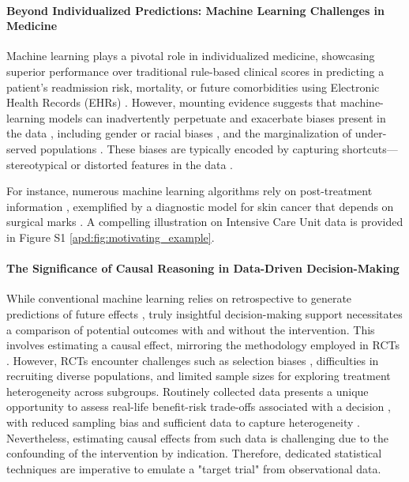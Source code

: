 \documentclass[10pt,letterpaper]{article}
\begin{document}
 \paragraph{Beyond Individualized Predictions: Machine Learning Challenges in Medicine} \cite{rajkomar2018scalable,liu2019comparison,li2020behrt,beaulieu2021machine,aggarwal2021diagnostic}
 Machine learning plays a pivotal role in individualized medicine, showcasing superior performance over traditional rule-based clinical scores in predicting a patient's readmission risk, mortality, or future comorbidities using Electronic Health Records (EHRs) \cite{rajkomar2018scalable,liu2019comparison,li2020behrt,beaulieu2021machine,aggarwal2021diagnostic}.
However, mounting evidence suggests that machine-learning models can inadvertently perpetuate and exacerbate biases present in the data \cite{rajkomar2018ensuring}, including gender or racial biases \cite{singh2022generalizability,gichoya2022ai}, and the marginalization of under-served populations \cite{seyyed2021underdiagnosis}. These biases are typically encoded by capturing shortcuts—stereotypical or distorted features in the data \cite{geirhos2020shortcut,winkler2019association,degrave2021ai}.

For instance, numerous machine learning algorithms rely on post-treatment information \cite{badgeley2019deep,obermeyer2019dissecting,yuan2021temporal,wong2021external}, exemplified by a diagnostic model for skin cancer that depends on surgical marks \cite{winkler2019association}. A compelling illustration on Intensive Care Unit data is provided in Figure S1 \ref{apd:fig:motivating_example}.

  \paragraph{The Significance of Causal Reasoning in Data-Driven Decision-Making} \cite{prosperi2020causal}
 While conventional machine learning relies on retrospective to generate predictions of future effects \cite{plecko2022causal}, truly insightful decision-making support necessitates a comparison of potential outcomes with and without the intervention. This involves estimating a causal effect, mirroring the methodology employed in RCTs \cite{prosperi2020causal}. However, RCTs encounter challenges such as selection biases \cite{travers2007external,averitt2020translating}, difficulties in recruiting diverse populations, and limited sample sizes for exploring treatment heterogeneity across subgroups. Routinely collected data presents a unique opportunity to assess real-life benefit-risk trade-offs associated with a decision \cite{desai2021broadening}, with reduced sampling bias and sufficient data to capture heterogeneity \cite{rekkas2023standardized}. Nevertheless, estimating causal effects from such data is challenging due to the confounding of the intervention by indication. Therefore, dedicated statistical techniques are imperative to emulate a "target trial" \cite{hernan2016specifying} from observational data.
\end{document}
